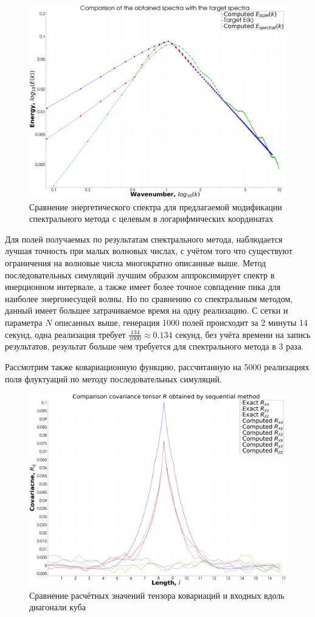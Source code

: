 \begin{figure}[ht] 
    \center
    \includegraphics [width=0.8\linewidth] {images/comparison_of_result_spectras.png}
    \caption{Сравнение энергетического спектра для предлагаемой модификации спектрального метода с целевым в логарифмических координатах} 
    \label{img:main_comparison_of_target_spectras}  
\end{figure}

Для полей получаемых по результатам спектрального метода, наблюдается лучшая точность при малых волновых числах, с учётом того что существуют ограничения на волновые числа многократно описанные выше. Метод последовательных симуляций лучшим образом аппроксимирует спектр в инерционном интервале, а также имеет более точное совпадение пика для наиболее энергонесущей волны. Но по сравнению со спектральным методом, данный имеет большее затрачиваемое время на одну реализацию. С сетки и параметра $N$ описанных выше, генерация 1000 полей происходит за 2 минуты 14 секунд, одна реализация требует $\frac{134}{1000} \approx 0.134$ секунд, без учёта времени на запись результатов, результат больше чем требуется для спектрального метода в 3 раза.

Рассмотрим также ковариационную функцию, рассчитанную на 5000 реализациях поля флуктуаций по методу последовательных симуляций. 

\begin{figure}[ht] 
    \center
    \includegraphics [width=0.8\linewidth] {images/kriging/covariance_tensor.png}
    \caption{Сравнение расчётных значений тензора ковариаций и входных вдоль диагонали куба} 
    \label{img:main_comparison_of_target_cov_function_and_computed}  
\end{figure}

